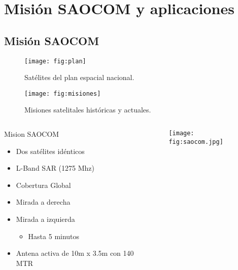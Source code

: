 \section{Misión SAOCOM y aplicaciones}
\subsection{Misión SAOCOM}

\begin{frame}{} \vskip0cm
  \begin{figure}
    \centering
    \texttt{[image: fig:plan]}
    \caption{Satélites del plan espacial nacional.}
    \label{}
  \end{figure}
\end{frame}

\begin{frame}{} \vskip0cm
  \begin{figure}
    \centering
    \texttt{[image: fig:misiones]}
    \caption{Misiones satelitales históricas y actuales.}
    \label{}
  \end{figure}
\end{frame}



\begin{frame}{} \vskip0cm
  \begin{columns}
    \begin{column}{0.6\textwidth}
     \begin{block}{Mision SAOCOM}
\begin{itemize}
  \item Dos satélites idénticos
  \item L-Band SAR (1275 Mhz)
  \item Cobertura Global
  \item Mirada a derecha
  \item Mirada a izquierda
  \begin{itemize}
    \item Hasta 5 minutos
  \end{itemize}
  \item Antena activa de 10m x 3.5m con 140 MTR
\end{itemize}
     \end{block}
    \end{column}
    \begin{column}{0.4\textwidth}  %
      \begin{figure}
        \centering
        \texttt{[image: fig:saocom.jpg]}
        \caption*{}
        \label{}
      \end{figure}
    \end{column}
    \end{columns}

\end{frame}

